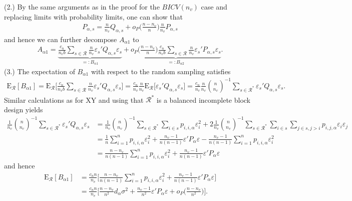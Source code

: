 \documentclass[Research_Module_ES.tex]{subfiles}
\begin{document}
(2.)
By the same arguments as in the proof for the $BICV(n_v)$ case and replacing limits with probability limits, one can show that
\begin{align*}
P_{\alpha,s}=\frac{n}{n_v}Q_{\alpha,s}+o_P\biggl(\frac{n-n_v}{n}\biggr)\frac{n}{n_v}P_{\alpha,s}
\end{align*}
and hence we can further decompose $A_{\alpha1}$ to
\begin{align*}
A_{\alpha1}= \underbrace{\frac{c_n}{n_vb}\sum_{s\in\mathcal{R}}\frac{n}{n_v}\varepsilon_s'Q_{\alpha,s}\varepsilon_s}_{=:B_{\alpha1}}
+ \underbrace{o_P\biggl(\frac{n-n_v}{n}\biggr)\frac{c_n}{n_vb}\sum_{s\in\mathcal{R}}\frac{n}{n_v}\varepsilon_s'P_{\alpha,s}\varepsilon_s}_{=:B_{\alpha2}}.
\end{align*}
(3.)
The expectation of $B_{\alpha1}$ with respect to the random sampling satisfies
\begin{align*}
\mathrm{E}_\mathcal{R}[B_{\alpha1}]= \mathrm{E}_\mathcal{R}\biggl[ \frac{c_n}{n_vb}\sum_{s\in\mathcal{R}}\frac{n}{n_v}\varepsilon_s'Q_{\alpha,s}\varepsilon_s\biggr]
=\frac{c_n}{n_v} \frac{n}{n_v} \mathrm{E}_\mathcal{R}\bigl[\varepsilon_s'Q_{\alpha,s}\varepsilon_s\bigr]
= \frac{c_n}{n_v} \frac{n}{n_v}\binom{n}{n_v}^{-1}\sum_{s\in \mathcal{R}^\ast}\varepsilon_s'Q_{\alpha,s}\varepsilon_s.
\end{align*}
Similar calculations as for XY and using that $\mathcal{R}^\ast$ is a balanced incomplete block design yields 
\begin{align*}
\frac{1}{n_v}\binom{n}{n_v}^{-1}\sum_{s\in \mathcal{R}^\ast}\varepsilon_s'Q_{\alpha,s}\varepsilon_s 
&= \frac{1}{n_v}\binom{n}{n_v}^{-1}\sum_{s\in \mathcal{R}^\ast} \sum_{i\in s} p_{i,i,\alpha}\varepsilon_i^2 
+ 2\frac{1}{n_v}\binom{n}{n_v}^{-1}\sum_{s\in \mathcal{R}^\ast} \sum_{i\in s} \sum_{j\in s, j>i} p_{i,j,\alpha}\varepsilon_i\varepsilon_j \\
&= \frac{1}{n}\sum_{i=1}^n p_{i,i,\alpha}\varepsilon_i^2 + \frac{n_v-1}{n(n-1)}\varepsilon'P_\alpha\varepsilon - \frac{n_v-1}{n(n-1)}\sum_{i=1}^n p_{i,i,\alpha}\varepsilon_i^2\\
&=\frac{n-n_v}{n(n-1)}\sum_{i=1}^n p_{i,i,\alpha}\varepsilon_i^2
+\frac{n_v-1}{n(n-1)}\varepsilon'P_\alpha\varepsilon
\end{align*}
and hence
\begin{align*}
\mathrm{E}_\mathcal{R}[B_{\alpha1}]
&=\frac{c_nn}{n_v}\biggl[\frac{n-n_v}{n(n-1)}\sum_{i=1}^n p_{i,i,\alpha}\varepsilon_i^2
+\frac{n_v-1}{n(n-1)}\varepsilon'P_\alpha\varepsilon\biggr]\\
&=\frac{c_nn}{n_v}\biggl[\frac{n-n_v}{n^2}d_\alpha\sigma^2
+\frac{n_v-1}{n^2}\varepsilon'P_\alpha\varepsilon + o_P\biggl(\frac{n-n_v}{n^2}\biggr)\biggr].
\end{align*}
\end{document}
